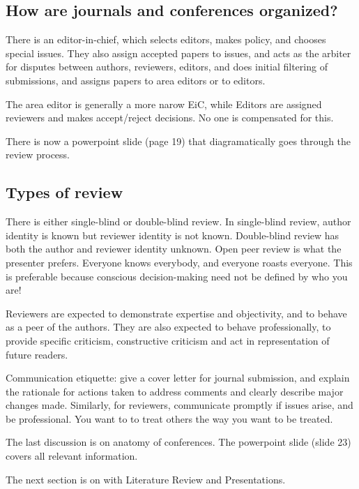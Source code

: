\documentclass[10pt, oneside]{article}
\begin{document}
\subsection{How are journals and conferences organized?}
There is an editor-in-chief, which selects editors, makes policy, and chooses special issues. They also assign accepted papers to issues, and acts as the arbiter for disputes between authors, reviewers, editors, and does initial filtering of submissions, and assigns papers to area editors or to editors. 

The area editor is generally a more narow EiC, while Editors are assigned reviewers and makes accept/reject decisions. No one is compensated for this. 

There is now a powerpoint slide (page 19) that diagramatically goes through the review process. 

\subsection{Types of review}
There is either single-blind or double-blind review. In single-blind review, author identity is known but reviewer identity is not known. Double-blind review has both the author and reviewer identity unknown. Open peer review is what the presenter prefers. Everyone knows everybody, and everyone roasts everyone. This is preferable because conscious decision-making need not be defined by who you are! 

Reviewers are expected to demonstrate expertise and objectivity, and to behave as a peer of the authors. They are also expected to behave professionally, to provide specific criticism, constructive criticism and act in representation of future readers. 

Communication etiquette: give a cover letter for journal submission, and explain the rationale for actions taken to address comments and clearly describe major changes made. Similarly, for reviewers, communicate promptly if issues arise, and be professional. You want to to treat others the way you want to be treated. 

The last discussion is on anatomy of conferences. The powerpoint slide (slide 23) covers all relevant information. 

The next section is on with Literature Review and Presentations.
\end{document}
